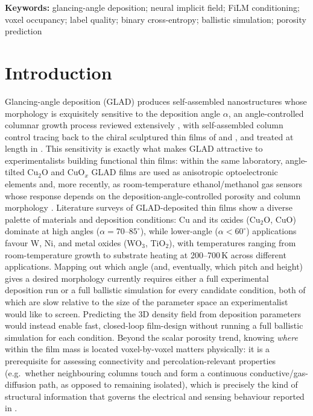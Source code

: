\documentclass[aip,amsmath,amssymb,reprint]{revtex4-1}
\renewcommand{\ang}{\ensuremath{\alpha}} %
\begin{document}
\maketitle

\medskip
\noindent\textbf{Keywords:} glancing-angle deposition; neural implicit
field; FiLM conditioning; voxel occupancy; label quality; binary
cross-entropy; ballistic simulation; porosity prediction

\section{Introduction}
\label{sec:intro}

Glancing-angle deposition (GLAD) produces self-assembled nanostructures
whose morphology is exquisitely sensitive to the deposition angle $\ang$,
an angle-controlled columnar growth process reviewed extensively
\citep{hawkeye2014,barranco2016,hawkeye2007}, with self-assembled column
control tracing back to the chiral sculptured thin films of
\citet{robbie1996nature} and \citet{brett2008science}, and treated at
length in \citet{lakhtakia2005stf}.
This sensitivity is exactly what makes GLAD attractive to
experimentalists building functional thin films: within the same
laboratory, angle-tilted Cu$_2$O and CuO$_x$ GLAD films are used as
anisotropic optoelectronic elements \citep{chaffar2018,chaffar2019}
and, more recently, as room-temperature ethanol/methanol gas sensors
whose response depends on the deposition-angle-controlled porosity
and column morphology \citep{benamor2026}.
Literature surveys of GLAD-deposited thin films show a diverse palette
of materials and deposition conditions: Cu and its oxides (Cu$_2$O, CuO)
dominate at high angles ($\ang = 70\text{--}85^{\circ}$), while lower-angle
($\ang < 60^{\circ}$) applications favour W, Ni, and metal oxides (WO$_3$, TiO$_2$),
with temperatures ranging from room-temperature growth to substrate heating
at 200--700\,K across different applications.
Mapping out which angle (and, eventually, which pitch and height)
gives a desired morphology currently requires either a full
experimental deposition run or a full ballistic simulation for every
candidate condition, both of which are slow relative to the size of
the parameter space an experimentalist would like to screen.
Predicting the 3D density field from deposition parameters would
instead enable fast, closed-loop film-design without running a full
ballistic simulation for each condition.
Beyond the scalar porosity trend, knowing \emph{where} within the
film mass is located voxel-by-voxel matters physically: it is a
prerequisite for assessing connectivity and percolation-relevant
properties (e.g.\ whether neighbouring columns touch and form a
continuous conductive/gas-diffusion path, as opposed to remaining
isolated), which is precisely the kind of structural information
that governs the electrical and sensing behaviour reported in
\citep{chaffar2019,benamor2026}.
\end{document}
